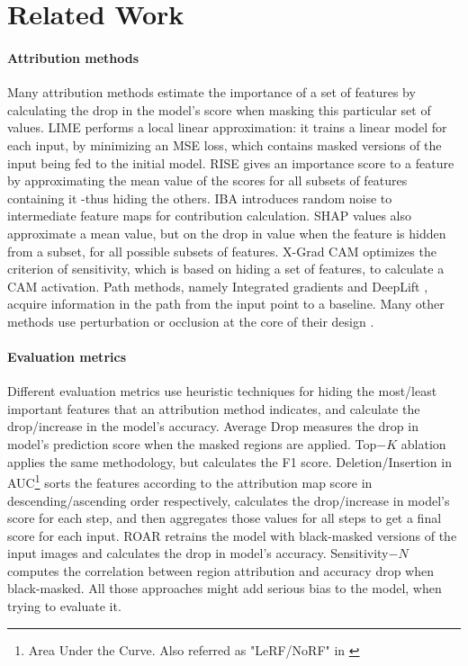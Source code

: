 \section{Related Work}
\label{sec:related}

\paragraph{Attribution methods}

Many attribution methods estimate the importance of a set of features by calculating the drop in the model's score when masking this particular set of values.
LIME \citep{ribeiro2016why} performs a local linear approximation: it trains a linear model for each input, by minimizing an MSE loss, which contains masked versions of the input being fed to the initial model. 
RISE \citep{petsiuk2018rise} gives an importance score to a feature by approximating the mean value of the scores for all subsets of features containing it -thus hiding the others. 
IBA \citep{schulz2020restricting} introduces random noise to intermediate feature maps for contribution calculation. 
SHAP values \citep{lundberg2017unified} also approximate a mean value, but on the drop in value when the feature is hidden from a subset, for all possible subsets of features. 
X-Grad CAM \citep{fu2020axiombased} optimizes the criterion of sensitivity, which is based on hiding a set of features, to calculate a CAM activation. 
Path methods, namely Integrated gradients \citep{sundararajan2017axiomatic} and DeepLift \citep{shrikumar2019learning}, acquire information in the path from the input point to a baseline. 
Many other methods use perturbation or occlusion at the core of their design \citep{ignatiev2018abductionbased, fel2021look, novello2022making, dabkowski2017real, NEURIPS2021_4e246a38, fong2019understanding, Fong2017}.

\paragraph{Evaluation metrics}

Different evaluation metrics use heuristic techniques for hiding the most/least important features that an attribution method indicates, and calculate the drop/increase in the model's accuracy. Average Drop \citep{Chattopadhay_2018} measures the drop in model's prediction score when the masked regions are applied. 
Top$-K$ ablation \citep{haug2021baselines} applies the same methodology, but calculates the F1 score. 
Deletion/Insertion in AUC\footnote{Area Under the Curve. Also referred as "LeRF/NoRF" in \citep{schulz2020restricting}} \citep{petsiuk2018rise}  sorts the features according to the attribution map score in descending/ascending order respectively, calculates the drop/increase in model's score for each step, and then aggregates those values for all steps to get a final score for each input. 
ROAR \citep{hooker2019benchmark} retrains the model with black-masked versions of the input images and calculates the drop in model's accuracy. 
Sensitivity$-N$ \citep{schulz2020restricting} computes the correlation between region attribution and accuracy drop when black-masked. 
All those approaches might add serious bias to the model, when trying to evaluate it.

